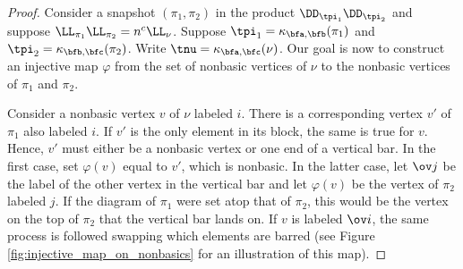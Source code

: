 \begin{proof}
    Consider a snapshot $(\pi_1,\pi_2)$ in the product $\DD_{\tpi_1}\DD_{\tpi_2}$ and suppose $\LL_{\pi_1}\LL_{\pi_2}=n^c\LL_\nu$. Suppose $\tpi_1=\kappa_{\bfa,\bfb}(\pi_1)$ and $\tpi_2=\kappa_{\bfb,\bfc}(\pi_2)$. Write $\tnu=\kappa_{\bfa,\bfc}(\nu)$. Our goal is now to construct an injective map $\varphi$ from the set of nonbasic vertices of $\nu$ to the nonbasic vertices of $\pi_1$ and $\pi_2$. 
    
    Consider a nonbasic vertex $v$ of $\nu$ labeled $i$. There is a corresponding vertex $v'$ of $\pi_1$ also labeled $i$. If $v'$ is the only element in its block, the same is true for $v$. Hence, $v'$ must either be a nonbasic vertex or one end of a vertical bar. In the first case, set $\varphi(v)$ equal to $v'$, which is nonbasic. In the latter case, let $\ov j$ be the label of the other vertex in the vertical bar and let $\varphi(v)$ be the vertex of $\pi_2$ labeled $j$. If the diagram of $\pi_1$ were set atop that of $\pi_2$, this would be the vertex on the top of $\pi_2$ that the vertical bar lands on. If $v$ is labeled $\ov i$, the same process is followed swapping which elements are barred (see Figure \ref{fig:injective_map_on_nonbasics} for an illustration of this map).


\end{proof}

